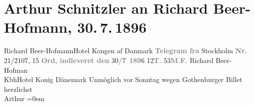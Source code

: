 

         
         \renewcommand{\erwaehntePersonen}{Personen: Richard Beer-Hofmann}
         \renewcommand{\erwaehnteOrte}{Orte: Göteborg, Hotel König von Dänemark, Kopenhagen, Stockholm}
         \renewcommand{\erwaehnteWerke}{}
               \section[Arthur Schnitzler an Richard Beer-Hofmann, 30. 7. 1896]{ Arthur Schnitzler an Richard Beer-Hofmann, 30. 7. 1896}\nopagebreak{}\rehead{ }\begin{ledgroupsized}[t]{13cm}\normalsize\beginnumbering \toendnotes[C]{\smallbreak\pagebreak[2]} 
\pstart{}{\pb}Richard Beer-Hofmann\pend{}\pstart{}Hotel Kongen af Danmark\pend{}{\bigskip}\pstart
           \noindent{}\centering{}{\pb}\textcolor{gray}{\textbf{Telegram
                  fra}}{ }Stockholm\pend
           \pstart
           \noindent{}\textcolor{gray}{\textbf{Nr.}} 21/2107, 15 \textcolor{gray}{\textbf{Ord, indleveret
                  den}}{ }30\textcolor{gray}{\textbf{/}}7 \textcolor{gray}{\textbf{189}}6{ }12\textcolor{gray}{\textbf{T.}}{ }53\textcolor{gray}{\textbf{M.F.}}\pend
           \pstart
           \raggedleft{}Richard Beer-Hofman{\\}KbhHotel Konig
               Dänemark\pend
           \pstart
           \noindent{}Unmöglich vor{ }Sonntag wegen Gothenburger Billet\pend
           \pstart
           herzlichst{\\[\baselineskip]}\spacefill\mbox{Arthur}\pend
           \leftskip=0em{}
         
         \endnumbering{}\end{ledgroupsized}  \newcommand{\dateiname}{L00574}\newcommand{\titel}{Arthur Schnitzler an Richard Beer-Hofmann, 30. 7. 1896}\newcommand{\editorInnen}{Martin Anton Müller und Gerd-Hermann Susen}
      